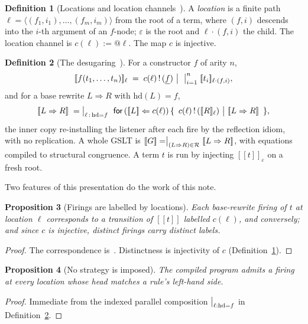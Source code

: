 \documentclass[11pt]{article}
\theoremstyle{definition}
\newtheorem{definition}{Definition}[section]
\theoremstyle{plain}
\newtheorem{proposition}[definition]{Proposition}
\newcommand{\sem}[1]{[\![#1]\!]}
\newcommand{\out}[2]{#1\,!\,(#2)}
\newcommand{\for}[3]{\mathsf{for}\,(#1 \Leftarrow #2)\,\{\,#3\,\}}
\newcommand{\rew}{\Rightarrow}
\begin{document}
\begin{definition}[Locations and location channels~{\cite[Def.~4.3]{knotted}}]\label{def:loc}
A \emph{location} is a finite path $\ell = \langle (f_1,i_1),\dots,(f_m,i_m)\rangle$ from the
root of a term, where $(f,i)$ descends into the $i$-th argument of an $f$-node; $\varepsilon$
is the root and $\ell\cdot(f,i)$ the child. The location channel is $c(\ell) := @\ell$.
The map $c$ is injective.
\end{definition}

\begin{definition}[The desugaring~{\cite[App.~A]{knotted}}]\label{def:desugar}
For a constructor $f$ of arity $n$,
\[
  \sem{f(t_1,\dots,t_n)}_\ell \;=\; \out{c(\ell)}{\underline{f}}
  \ \big|\ \textstyle\bigm|_{i=1}^{n} \sem{t_i}_{\ell\cdot(f,i)},
\]
and for a base rewrite $L \rew R$ with $\mathrm{hd}(L) = f$,
\[
  \sem{L \rew R} \;=\; \textstyle\bigm|_{\ell\,:\,\mathrm{hd}=f}\
  \for{\sem{L}}{c(\ell)}{\ \out{c(\ell)}{\sem{R}_\ell}\ \big|\ \sem{L \rew R}\ },
\]
the inner copy re-installing the listener after each fire by the reflection idiom, with no
replication. A whole GSLT is $\sem{G} = \bigm|_{(L\rew R)\in\mathcal{R}} \sem{L\rew R}$, with
equations compiled to structural congruence. A term $t$ is run by injecting
$\sem{t}_\varepsilon$ on a fresh root.
\end{definition}

Two features of this presentation do the work of this note.

\begin{proposition}[Firings are labelled by locations]\label{prop:labels}
Each base-rewrite firing of $t$ at location $\ell$ corresponds to a transition of $\sem{t}$
labelled $c(\ell)$, and conversely; and since $c$ is injective, distinct firings carry distinct
labels.
\end{proposition}

\begin{proof}
The correspondence is~\cite[Prop.~4.5]{knotted}. Distinctness is injectivity of $c$
(Definition~\ref{def:loc}).
\end{proof}

\begin{proposition}[No strategy is imposed]\label{prop:nostrategy}
The compiled program admits a firing at every location whose head matches a rule's left-hand
side.
\end{proposition}

\begin{proof}
Immediate from the indexed parallel composition $\bigm|_{\ell : \mathrm{hd}=f}$ in
Definition~\ref{def:desugar}.
\end{proof}
\end{document}
